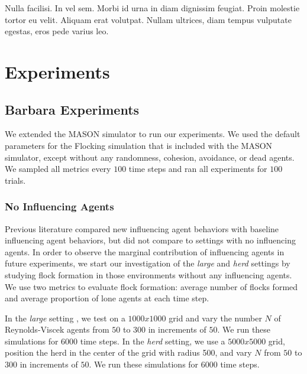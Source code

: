 \begin{savequote}[75mm]
Nulla facilisi. In vel sem. Morbi id urna in diam dignissim feugiat. Proin molestie tortor eu velit. Aliquam erat volutpat. Nullam ultrices, diam tempus vulputate egestas, eros pede varius leo.
\end{savequote}

\chapter{Experiments}
\label{ch:experiments}

\section{Barbara Experiments}

\label{sec:experimental}
We extended the MASON simulator to run our experiments.\cite{luke05mason}
We used the default parameters for the Flocking simulation that is included
with the MASON simulator, except without any randomness, cohesion, avoidance,
or dead agents.
We sampled all metrics every $100$ time steps and ran all experiments for $100$
trials.

\subsection{No Influencing Agents}
Previous literature compared new influencing agent behaviors with baseline
influencing agent behaviors, but did not compare to settings with no
influencing agents.
In order to observe the marginal contribution of influencing agents
in future experiments, we start our investigation of the \textit{large} and
\textit{herd} settings by studying flock formation in those environments without
any influencing agents.
We use two metrics to evaluate flock formation: average number of flocks
formed and average proportion of lone agents at each time step.

In the \textit{large} setting , we test on a $1000x1000$ grid and vary the
number $N$ of Reynolds-Viscek agents from $50$ to $300$ in increments of $50$.
We run these simulations for $6000$ time steps.
In the \textit{herd} setting, we use a $5000x5000$ grid, position the herd in
the center of the grid with radius 500, and vary $N$ from $50$ to $300$ in
increments of $50$.
We run these simulations for $6000$ time steps.

